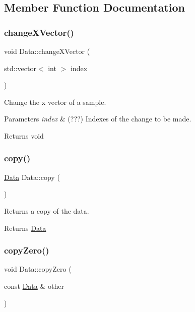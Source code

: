 \subsection{Member Function Documentation}
\mbox{\label{class_data_a3e66e3dce7675bf2a1eded906e3d7912}} 
\subsubsection{\texorpdfstring{change\+X\+Vector()}{changeXVector()}}
{\footnotesize\ttfamily void Data\+::change\+X\+Vector (\begin{DoxyParamCaption}\item[{std\+::vector$<$ int $>$}]{index }\end{DoxyParamCaption})}



Change the x vector of a sample. 


\begin{DoxyParams}{Parameters}
{\em index} & (???) Indexes of the change to be made. \\
\hline
\end{DoxyParams}
\begin{DoxyReturn}{Returns}
void 
\end{DoxyReturn}
\mbox{\label{class_data_afb7687021aa7d5f1ecae464eee601710}} 
\subsubsection{\texorpdfstring{copy()}{copy()}}
{\footnotesize\ttfamily \hyperlink{class_data}{Data} Data\+::copy (\begin{DoxyParamCaption}{ }\end{DoxyParamCaption})}



Returns a copy of the data. 

\begin{DoxyReturn}{Returns}
\hyperlink{class_data}{Data} 
\end{DoxyReturn}
\mbox{\label{class_data_a6454e835f570d10e7614ac237d6fdf79}} 
\subsubsection{\texorpdfstring{copy\+Zero()}{copyZero()}}
{\footnotesize\ttfamily void Data\+::copy\+Zero (\begin{DoxyParamCaption}\item[{const \hyperlink{class_data}{Data} \&}]{other }\end{DoxyParamCaption})}




